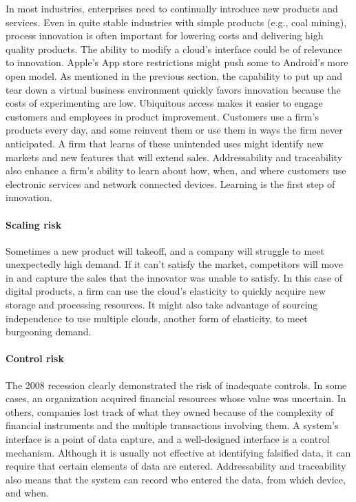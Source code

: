\documentclass[
]{article}
\begin{document}
In most industries, enterprises need to continually introduce new
products and services. Even in quite stable industries with simple
products (e.g., coal mining), process innovation is often important for
lowering costs and delivering high quality products. The ability to
modify a cloud's interface could be of relevance to innovation. Apple's
App store restrictions might push some to Android's more open model. As
mentioned in the previous section, the capability to put up and tear
down a virtual business environment quickly favors innovation because
the costs of experimenting are low. Ubiquitous access makes it easier to
engage customers and employees in product improvement. Customers use a
firm's products every day, and some reinvent them or use them in ways
the firm never anticipated. A firm that learns of these unintended uses
might identify new markets and new features that will extend sales.
Addressability and traceability also enhance a firm's ability to learn
about how, when, and where customers use electronic services and network
connected devices. Learning is the first step of innovation.

\hypertarget{scaling-risk}{%
\paragraph*{Scaling risk}\label{scaling-risk}}

Sometimes a new product will takeoff, and a company will struggle to
meet unexpectedly high demand. If it can't satisfy the market,
competitors will move in and capture the sales that the innovator was
unable to satisfy. In this case of digital products, a firm can use the
cloud's elasticity to quickly acquire new storage and processing
resources. It might also take advantage of sourcing independence to use
multiple clouds, another form of elasticity, to meet burgeoning demand.

\hypertarget{control-risk}{%
\paragraph*{Control risk}\label{control-risk}}

The 2008 recession clearly demonstrated the risk of inadequate controls.
In some cases, an organization acquired financial resources whose value
was uncertain. In others, companies lost track of what they owned
because of the complexity of financial instruments and the multiple
transactions involving them. A system's interface is a point of data
capture, and a well-designed interface is a control mechanism. Although
it is usually not effective at identifying falsified data, it can
require that certain elements of data are entered. Addressability and
traceability also means that the system can record who entered the data,
from which device, and when.
\end{document}
